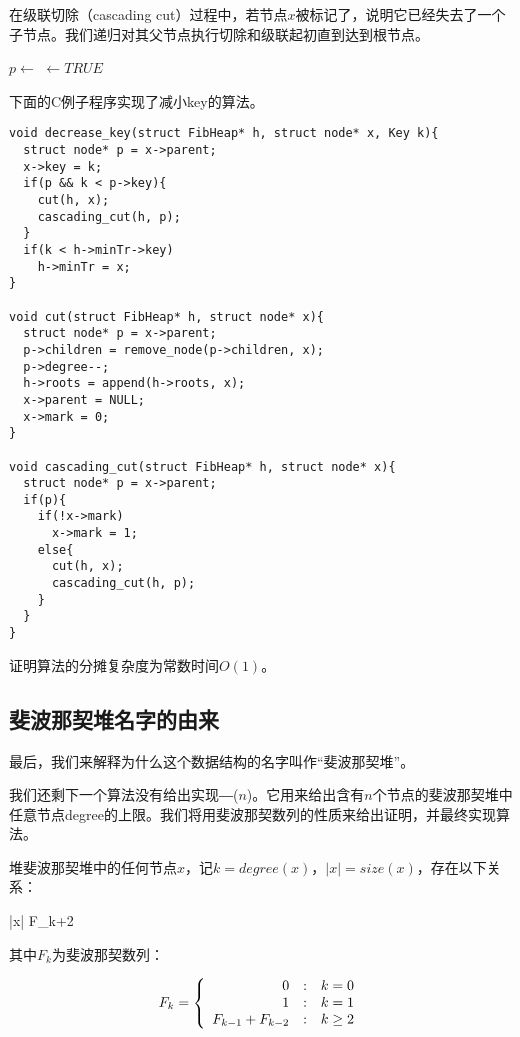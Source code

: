 \documentclass[UTF8]{article}
\begin{document}
在级联切除（cascading cut）过程中，若节点$x$被标记了，说明它已经失去了一个子节点。我们递归对其父节点执行切除和级联起初直到达到根节点。

\begin{algorithmic}[1]
  \State $p \gets $ 
      \State {} $\gets TRUE$
    \Else
      \State {}
      \State {}
    \EndIf
  \EndIf
\EndFunction
\end{algorithmic}

下面的C例子程序实现了减小key的算法。

\lstset{language=C}
\begin{lstlisting}
void decrease_key(struct FibHeap* h, struct node* x, Key k){
  struct node* p = x->parent;
  x->key = k;
  if(p && k < p->key){
    cut(h, x);
    cascading_cut(h, p);
  }
  if(k < h->minTr->key)
    h->minTr = x;
}

void cut(struct FibHeap* h, struct node* x){
  struct node* p = x->parent;
  p->children = remove_node(p->children, x);
  p->degree--;
  h->roots = append(h->roots, x);
  x->parent = NULL;
  x->mark = 0;
}

void cascading_cut(struct FibHeap* h, struct node* x){
  struct node* p = x->parent;
  if(p){
    if(!x->mark)
      x->mark = 1;
    else{
      cut(h, x);
      cascading_cut(h, p);
    }
  }
}
\end{lstlisting}

\begin{Exercise}
证明算法的分摊复杂度为常数时间$O(1)$。
\end{Exercise}

\subsection{斐波那契堆名字的由来}

最后，我们来解释为什么这个数据结构的名字叫作“斐波那契堆”。

我们还剩下一个算法没有给出实现―($n$)。它用来给出含有$n$个节点的斐波那契堆中任意节点degree的上限。我们将用斐波那契数列的性质来给出证明，并最终实现算法。

\begin{lemma}
\label{lemma:Fib-degree}
堆斐波那契堆中的任何节点$x$，记$k = degree(x)$，$|x| = size(x)$，存在以下关系：

\be
  |x| \geq F_{k+2}
\ee

其中$F_k$为斐波那契数列：

\[
F_k = \left \{
  \begin{array}
  {r@{\quad:\quad}l}
  0 & k = 0 \\
  1 & k = 1 \\
  F_{k-1} + F_{k-2} & k \geq 2
  \end{array}
\right.
\]
\end{lemma}
\end{document}
